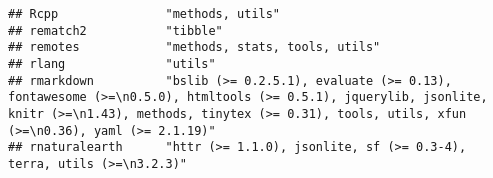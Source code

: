 \documentclass[
]{article}
\begin{document}
\begin{verbatim}
## Rcpp               "methods, utils"                                                                                                                                                                                                                                                                                                                                                                                                                             
## rematch2           "tibble"                                                                                                                                                                                                                                                                                                                                                                                                                                     
## remotes            "methods, stats, tools, utils"                                                                                                                                                                                                                                                                                                                                                                                                               
## rlang              "utils"                                                                                                                                                                                                                                                                                                                                                                                                                                      
## rmarkdown          "bslib (>= 0.2.5.1), evaluate (>= 0.13), fontawesome (>=\n0.5.0), htmltools (>= 0.5.1), jquerylib, jsonlite, knitr (>=\n1.43), methods, tinytex (>= 0.31), tools, utils, xfun (>=\n0.36), yaml (>= 2.1.19)"                                                                                                                                                                                                                                  
## rnaturalearth      "httr (>= 1.1.0), jsonlite, sf (>= 0.3-4), terra, utils (>=\n3.2.3)"                                                                                                                                                                                                                                                                                                                                                                         

\end{verbatim}
\end{document}
